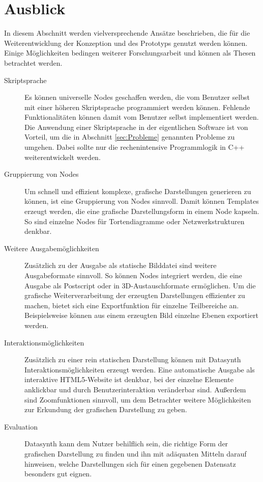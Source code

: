 \documentclass[a4paper, 
               12pt,
               DIV=calc,
               version=first,
               pdftex,
               headsepline,
               footsepline,
               bibtotocnumbered,
               liststotocnumbered]{scrreprt}
\begin{document}
\section{Ausblick}
\label{sec:Ausblick}
In diesem Abschnitt werden vielversprechende Ansätze beschrieben, die für die Weiterentwicklung
der Konzeption und des Prototyps genutzt werden können. Einige Möglichkeiten bedingen weiterer 
Forschungsarbeit und können als Thesen betrachtet werden.
\begin{description}
\item[Skriptsprache]
Es können universelle Nodes geschaffen werden, die vom Benutzer selbst mit einer höheren
Skriptsprache programmiert werden können. Fehlende Funktionalitäten
können damit vom Benutzer selbst implementiert werden.
Die Anwendung einer Skriptsprache in der eigentlichen Software ist von Vorteil, um die in
Abschnitt \ref{sec:Probleme} genannten Probleme zu umgehen. Dabei sollte nur
die rechenintensive Programmlogik in C++ weiterentwickelt werden.
\item[Gruppierung von Nodes]
Um schnell und effizient komplexe, grafische Darstellungen generieren zu können,
ist eine Gruppierung von Nodes sinnvoll. Damit können Templates erzeugt werden,
die eine grafische Darstellungsform in einem Node kapseln. So sind einzelne Nodes
für Tortendiagramme oder Netzwerkstrukturen denkbar.
\item[Weitere Ausgabemöglichkeiten]
Zusätzlich zu der Ausgabe als statische Bilddatei sind weitere Ausgabeformate sinnvoll.
So können Nodes integriert werden, die eine Ausgabe als Postscript oder
in 3D-Austauschformate ermöglichen. Um die grafische Weiterverarbeitung der erzeugten
Darstellungen effizienter zu machen, bietet sich eine Exportfunktion für einzelne Teilbereiche
an. Beispielsweise können aus einem erzeugten Bild einzelne Ebenen exportiert werden.
\item[Interaktionsmöglichkeiten]
Zusätzlich zu einer rein statischen Darstellung können mit Datasynth
Interaktionsmöglichkeiten erzeugt werden. Eine automatische
Ausgabe als interaktive HTML5-Website ist denkbar, bei der einzelne Elemente
anklickbar und durch Benutzerinteraktion veränderbar sind. Außerdem sind 
Zoomfunktionen sinnvoll, um dem Betrachter weitere Möglichkeiten zur
Erkundung der grafischen Darstellung zu geben.
\item[Evaluation]
Datasynth kann dem Nutzer behilflich sein, die richtige Form
der grafischen Darstellung zu finden und ihn mit adäquaten Mitteln darauf
hinweisen, welche Darstellungen sich für einen gegebenen Datensatz besonders gut eignen.
\end{description}
    
\end{document}
